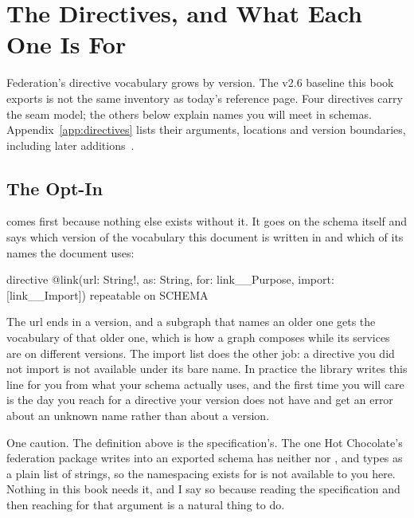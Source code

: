 \section{The Directives, and What Each One Is For}
\label{sec:ch05-the-directives}

%
Federation's directive vocabulary grows by version. The v2.6 baseline this
book exports is not the same inventory as today's reference page. Four
directives carry the seam model; the others below explain names you will meet
in schemas. Appendix~\ref{app:directives} lists their arguments, locations and
version boundaries, including later additions~\autocite{apollosubgraphspec}.

\subsection{The Opt-In}

%
 comes first because nothing else exists without it. It goes on the
schema itself and says which version of the vocabulary this document is written
in and which of its names the document uses:

\begin{graphqlsdl}
directive @link(url: String!, as: String, for: link__Purpose,
                import: [link__Import]) repeatable on SCHEMA
\end{graphqlsdl}

%
The url ends in a version, and a subgraph that names an older one gets the
vocabulary of that older one, which is how a graph composes while its services
are on different versions. The import list does the other job: a directive you
did not import is not available under its bare name. In practice the library
writes this line for you from what your schema actually uses, and the first
time you will care is the day you reach for a directive your version does not
have and get an error about an unknown name rather than about a version.

%
One caution. The definition above is the specification's. The one Hot
Chocolate's federation package writes into an exported schema has neither
 nor , and types  as a plain list of strings, so
the namespacing  exists for is not available to you here. Nothing in
this book needs it, and I say so because reading the specification and
then reaching for that argument is a natural thing to do.

